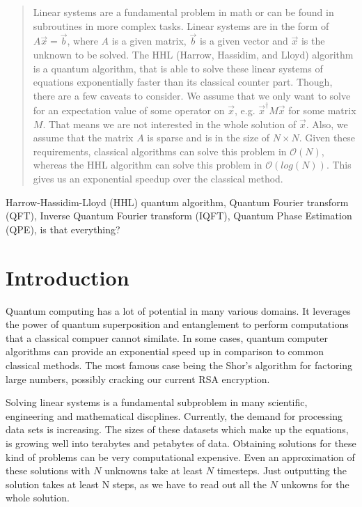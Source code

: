 


\begin{abstract}
Linear systems are a fundamental problem in math or can be found in subroutines in more complex tasks.
Linear systems are in the form of $A \vec x = \vec b$, where $A$ is a given matrix, $\vec b$ is a given vector and $\vec x$ is the unknown to be solved.
The HHL (Harrow, Hassidim, and Lloyd) algorithm is a quantum algorithm, that is able to solve these linear systems of equations exponentially faster than its classical counter part. 
Though, there are a few caveats to consider.
We assume that we only want to solve for an expectation value of some operator on $\vec x$, e.g. $\vec{x}^\dagger M \vec x$ for some matrix $M$.
That means we are not interested in the whole solution of $\vec x$.
Also, we assume that the matrix $A$ is sparse and is in the size of $N\times N$. 
Given these requirements, classical algorithms can solve this problem in $\mathcal{O}(N )$, whereas the HHL algorithm can solve this problem in $\mathcal{O}(log (N) )$.
This gives us an exponential speedup over the classical method.
\end{abstract}

\begin{IEEEkeywords}
Harrow-Hassidim-Lloyd (HHL) quantum algorithm, 
Quantum Fourier transform (QFT), 
Inverse Quantum Fourier transform (IQFT), 
Quantum Phase Estimation (QPE),
is that everything?
\end{IEEEkeywords}



\section{Introduction}


Quantum computing has a lot of potential in many various domains. 
It leverages the power of quantum superposition and entanglement to perform computations that a classical compuer cannot similate.
In some cases, quantum computer algorithms can provide an exponential speed up in comparison to common classical methods.
The most famous case being the Shor's algorithm for factoring large numbers, possibly cracking our current RSA encryption.

Solving linear systems is a fundamental subproblem in many scientific, engineering and mathematical discplines. 
Currently, the demand for processing data sets is increasing. 
The sizes of these datasets which make up the equations, is growing well into terabytes and petabytes of data.
Obtaining solutions for these kind of problems can be very computational expensive.
Even an approximation of these solutions with $N$ unknowns take at least $N$ timesteps.
Just outputting the solution takes at least N steps, as we have to read out all the $N$ unkowns for the whole solution.

